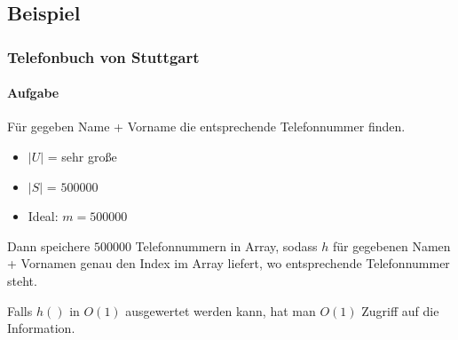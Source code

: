 \subsection{Beispiel}
\subsubsection*{Telefonbuch von Stuttgart}
\paragraph*{Aufgabe} Für gegeben Name + Vorname die entsprechende Telefonnummer finden.
\begin{itemize}
	\item $|U|$ = sehr große
	\item $|S|$ = $500 000$
	\item Ideal: $m = 500 000$
\end{itemize}
Dann speichere $500 000$ Telefonnummern in Array, sodass $h$ für gegebenen Namen + Vornamen genau den Index im Array liefert, wo entsprechende Telefonnummer steht.

\minisec{} Falls $h()$ in $O(1)$ ausgewertet werden kann, hat man $O(1)$ Zugriff auf die Information.
